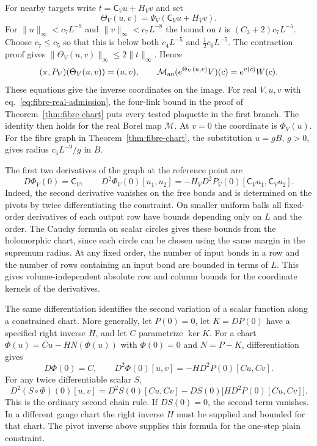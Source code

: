 \documentclass[11pt,letterpaper,reqno]{amsart}
\numberwithin{equation}{section}
\renewcommand{\eqref}[1]{\textup{eq.~\ref{#1}}}
\theoremstyle{definition}
\theoremstyle{remark}
\begin{document}
For nearby targets write \(t=\mathsf C_Vu+H_Vv\) and set
\begin{equation}\label{eq:fibre-product-chart}
 \Theta_V(u,v)=\Psi_V(\mathsf C_Vu+H_Vv).
\end{equation}
For \(\|u\|_\infty<c_7L^{-9}\) and \(\|v\|_\infty<c_7L^{-8}\)
the bound on \(t\) is \((C_3+2)c_7L^{-5}\). Choose \(c_7\leq c_5\)
so that this is below both \(c_4L^{-5}\) and
\(\tfrac12c_6L^{-5}\). The contraction proof gives
\(\|\Theta_V(u,v)\|_\infty\leq2\|t\|_\infty\). Hence
\[
 (\pi,P_V)(\Theta_V(u,v))=(u,v),\qquad
 \mathcal M_{\rm an}(e^{\Theta_V(u,v)}V)(c)=e^{v(c)}W(c).
\]
These equations give the inverse coordinates on the image.
For real \(V,u,v\) with \eqref{eq:fibre-real-admission}, the
four-link bound in the proof of Theorem~\ref{thm:fibre-chart}
puts every tested plaquette in the first branch. The identity
then holds for the real Borel map \(\mathcal M\). At \(v=0\)
the coordinate is \(\Phi_V(u)\). For the fibre graph in Theorem~\ref{thm:fibre-chart}, the substitution
\(u=gB\), \(g>0\), gives radius \(c_5L^{-9}/g\) in \(B\).

The first two derivatives of the graph at the reference point are
\begin{equation}\label{eq:fibre-second-jet}
 D\Phi_V(0)=\mathsf C_V,\qquad
 D^2\Phi_V(0)[u_1,u_2]
  =-H_V D^2P_V(0)[\mathsf C_Vu_1,\mathsf C_Vu_2].
\end{equation}
Indeed, the second derivative vanishes on the free bonds and is determined on
the pivots by twice differentiating the constraint. On smaller uniform balls
all fixed-order derivatives of each output row have bounds depending only on
$L$ and the order. The Cauchy formula on scalar circles gives these bounds
from the holomorphic chart, since each circle can be chosen using the same
margin in the supremum radius. At any fixed order, the number of input bonds
in a row and the number of rows containing an input bond are bounded in terms
of $L$. This gives volume-independent absolute row and column bounds for the
coordinate kernels of the derivatives.

The same differentiation identifies the second variation of a
scalar function along a constrained chart. More generally, let
$P(0)=0$, let $K=DP(0)$ have a specified right inverse $H$,
and let $C$ parametrize $\ker K$. For a chart
$\Phi(u)=Cu-HN(\Phi(u))$ with $\Phi(0)=0$ and $N=P-K$,
differentiation gives
\[
 D\Phi(0)=C,\qquad D^2\Phi(0)[u,v]=-H D^2P(0)[Cu,Cv].
\]
For any twice differentiable scalar $S$,
\begin{equation}\label{eq:fibre-composition-hessian}
 D^2(S\circ\Phi)(0)[u,v]
 =D^2S(0)[Cu,Cv]-DS(0)\bigl[H D^2P(0)[Cu,Cv]\bigr].
\end{equation}
This is the ordinary second chain rule. If $DS(0)=0$, the
second term vanishes. In a
different gauge chart the right inverse $H$ must be supplied
and bounded for that chart. The pivot inverse above supplies
this formula for the one-step plain constraint.
\end{document}

